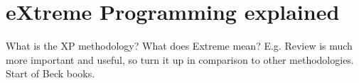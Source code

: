 \section{eXtreme Programming explained}
What is the XP methodology?
What does Extreme mean? E.g. Review is much more important and useful, so turn it up in comparison to other methodologies.
Start of Beck books.